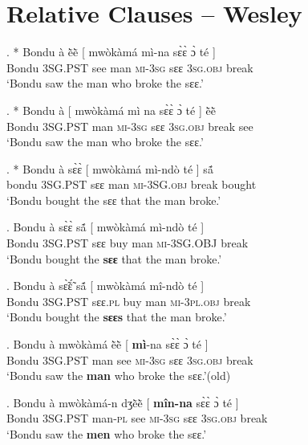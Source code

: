 \documentclass{assets/fieldnotes}
\begin{document}
\section{Relative Clauses -- Wesley}


\exg. * Bondu à ẽ̀ẽ̀ {[} mwòkàmá mì-na sɛ̀ɛ̀ ɔ̀ té {]}\\
Bondu \textsc{3SG.PST} see {} man \textsc{mi}-\textsc{3sg} sɛɛ \textsc{3sg.obj} break {}\\
`Bondu saw the man who broke the sɛɛ.’

\exg. * Bondu à {[} mwòkàmá mì na sɛ̀ɛ̀ ɔ̀ té {]} ẽ̀ẽ̀ \\
Bondu \textsc{3SG.PST} {} man \textsc{mi}-\textsc{3sg} sɛɛ \textsc{3sg.obj} break {} see \\
`Bondu saw the man who broke the sɛɛ.’\\

\exg. * Bondu à sɛ̀ɛ̀ {[} mwòkàmá mì-ndò té {]} sã́\\
bondu \textsc{3SG.PST} sɛɛ {} man \textsc{mi}-\textsc{3SG.obj} break {} bought\\
`Bondu bought the sɛɛ that the man broke.'

\exg. Bondu à sɛ̀ɛ̀ sã́ {[} mwòkàmá mì-ndò té {]}\\
Bondu \textsc{3SG.PST} sɛɛ buy {} man \textsc{mi}-\textsc{3SG.OBJ} break {}\\
`Bondu bought the \textbf{sɛɛ} that the man broke.'

\exg. Bondu à sɛ̃̀ɛ̃́ sã́ {[} mwòkàmá mî-ndò té {]} \\
Bondu \textsc{3SG.PST} sɛɛ.\textsc{pl} buy {} man \textsc{mi}-\textsc{3pl.obj} break {}\\
`Bondu bought the \textbf{sɛɛs} that the man broke.'

\exg. Bondu à mwòkàmá ẽ̀ẽ̀ {[} \textbf{mì}-na sɛ̀ɛ̀ ɔ̀ té {]}\\
Bondu \textsc{3SG.PST} man see {} \textsc{mi}-\textsc{3sg} sɛɛ \textsc{3sg.obj} break {}\\
`Bondu saw the \textbf{man} who broke the sɛɛ.’\hfill{(old)}

\exg. Bondu à mwòkàmá-n dʒẽ̀ẽ̀ {[} \textbf{mîn-na} sɛ̀ɛ̀ ɔ̀ té {]}\\
Bondu \textsc{3SG.PST} man-\textsc{pl} see {} \textsc{mi}-\textsc{3sg} sɛɛ \textsc{3sg.obj} break {}\\ `Bondu saw the \textbf{men} who broke the sɛɛ.'
\end{document}
